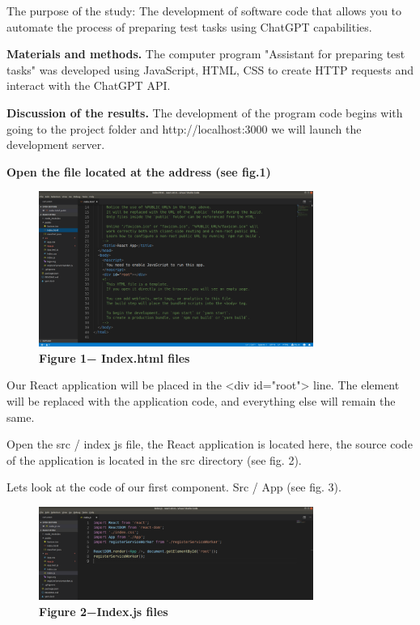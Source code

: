 The purpose of the study: The development of software code that allows
you to automate the process of preparing test tasks using ChatGPT
capabilities.

{\bfseries Materials and methods.} The computer program "Assistant for
preparing test tasks" was developed using JavaScript, HTML, CSS to
create HTTP requests and interact with the ChatGPT API.

{\bfseries Discussion of the results.} The development of the program code
begins with going to the project folder and http://localhost:3000 we
will launch the development server.

{\bfseries Open the file located at the address (see fig.1)}

\begin{figure}[H]
	\centering
	\includegraphics[width=0.8\textwidth]{assets/126}
	\caption*{\bfseries Figure 1− Index.html files}
\end{figure}

Our React application will be placed in the \textless div
id="root"\textgreater{} line. The element will be replaced with the
application code, and everything else will remain the same.

Open the src / index js file, the React application is located here, the
source code of the application is located in the src directory (see fig.
2).

Let\textquotesingle s look at the code of our first component. Src / App
(see fig. 3).

\begin{figure}[H]
	\centering
	\includegraphics[width=0.8\textwidth]{assets/127}
	\caption*{\bfseries Figure 2−Index.js files}
\end{figure}


